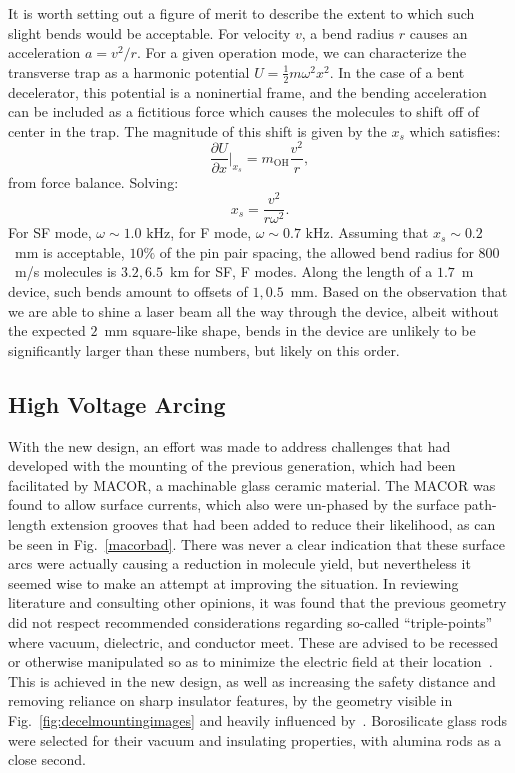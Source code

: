 It is worth setting out a figure of merit to describe the extent to which such slight bends would be acceptable. 
For velocity $v$, a bend radius $r$ causes an acceleration $a=v^2/r$. 
For a given operation mode, we can characterize the transverse trap as a harmonic potential $U=\frac{1}{2}m\omega^2x^2$. 
In the case of a bent decelerator, this potential is a noninertial frame, and the bending acceleration can be included as a fictitious force which causes the molecules to shift off of center in the trap.
The magnitude of this shift is given by the $x_s$ which satisfies:
\begin{equation}
\frac{\partial U}{\partial x}\biggr|_{x_s} = m_\text{OH}\frac{v^2}{r},
\end{equation}
from force balance. Solving:
\begin{equation}
x_s = \frac{v^2}{r\omega^2}.
\end{equation}
For SF mode, $\omega\sim1.0\text{ kHz}$, for F mode, $\omega\sim0.7\text{ kHz}$. Assuming that $x_s\sim0.2$~mm is acceptable, $10\%$ of the pin pair spacing, the allowed bend radius for $800$~m/s molecules is $3.2, 6.5$~km for SF, F modes.
Along the length of a $1.7$~m device, such bends amount to offsets of $1, 0.5$~mm.
Based on the observation that we are able to shine a laser beam all the way through the device, albeit without the expected $2$~mm square-like shape, bends in the device are unlikely to be significantly larger than these numbers, but likely on this order.

\subsection{High Voltage Arcing}

With the new design, an effort was made to address challenges that had developed with the mounting of the previous generation, which had been facilitated by MACOR, a machinable glass ceramic material.
The MACOR was found to allow surface currents, which also were un-phased by the surface path-length extension grooves that had been added to reduce their likelihood, as can be seen in Fig.~\ref{macorbad}.
There was never a clear indication that these surface arcs were actually causing a reduction in molecule yield, but nevertheless it seemed wise to make an attempt at improving the situation.
In reviewing literature and consulting other opinions, it was found that the previous geometry did not respect recommended considerations regarding so-called ``triple-points'' where vacuum, dielectric, and conductor meet. 
These are advised to be recessed or otherwise manipulated so as to minimize the electric field at their location~\cite{Miller1989}.
This is achieved in the new design, as well as increasing the safety distance and removing reliance on sharp insulator features, by the geometry visible in Fig.~\ref{fig:decelmountingimages} and heavily influenced by~\citep[Fig.~4]{VanDeMeerakker2006}.
Borosilicate glass rods were selected for their vacuum and insulating properties, with alumina rods as a close second.


